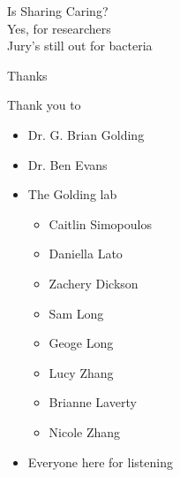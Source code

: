 \documentclass[dvipsnames]{beamer}
\begin{document}
\begin{frame}[fragile]{}%
    \begin{center}
         \Huge \textcolor{OliveGreen}{Is Sharing Caring?}\\
        \vspace{0.2in}
        \Large
         Yes, for researchers\\
         Jury's still out for bacteria
    \end{center}
\end{frame}
\begin{frame}[fragile]{Thanks}
    \begin{multicols}{2}
    \begin{minipage}[b][40ex][t]{\linewidth}
    Thank you to
    \begin{itemize}
        \item Dr. G. Brian Golding
        \item Dr. Ben Evans
        \item The Golding lab
            \begin{itemize}
                \item Caitlin Simopoulos
                \item Daniella Lato
                \item Zachery Dickson
                \item Sam Long
                \item Geoge Long
                \item Lucy Zhang
                \item Brianne Laverty
                \item Nicole Zhang
            \end{itemize}
        \item Everyone here for listening
    \end{itemize}
    \end{minipage}
    \begin{minipage}[b][20ex][t]{\linewidth}
    \begin{figure}[htb!]

\end{figure}
\end{minipage}
\end{multicols}
\end{frame}
\end{document}
